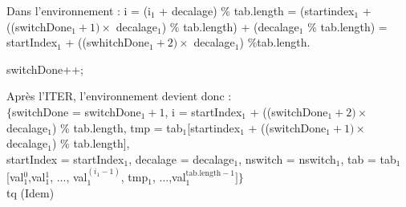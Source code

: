  Dans l'environnement : i = (i$_{1}$ + decalage) \% tab.length = (startindex$_{1}$ + ((switchDone$_{1}+1)\times$ decalage$_{1}$) $\%$ tab.length)  + (decalage$_{1}$ $\%$ tab.length) = startIndex$_{1}$ + ((swhitchDone$_{1}+2)\times$ decalage$_{1}$) $\%$tab.length.
 
\begin{center}
switchDone++;\\
\end{center}
 
Après l'ITER, l'environnement devient donc : \\

\noindent$\{$switchDone = switchDone$_{1}+1$, i = startIndex$_{1}$ + ((switchDone$_{1}+2)\times$ decalage$_1$) \% tab.length,
tmp = tab$_{1}$[startindex$_{1}$ + ((switchDone$_{1}+1)\times$ decalage$_{1}$) \% tab.length], \\
startIndex = startIndex$_{1}$, decalage = decalage$_{1}$, nswitch = nswitch$_{1}$, tab = tab$_{1}$[val$_{1}^{0}$,val$_{1}^{1}$, ..., val$_{1}^{(i_{1}-1)}$, tmp$_{1}$, ...,val$_{1}^{\mathrm{tab.length}-1}]\}$\\
tq (Idem)\\

